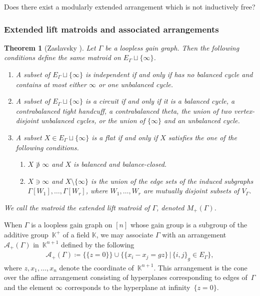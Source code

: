 \documentclass[pdftex]{sigma}
\numberwithin{equation}{section}
\newtheorem{Theorem}{Theorem}[section]
\begin{document}
\begin{Question}Does there exist a modularly extended arrangement which is not inductively free?
\end{Question}


\subsubsection{Extended lift matroids and associated arrangements}
\begin{Theorem}[{Zaslavsky \cite[Theorem~3.1]{zaslavsky1991biased-joctsb}}]\label{Zaslavsky extended lift matroid}
Let $ \Gamma $ be a loopless gain graph.
Then the following conditions define the same matroid on $ E_{\Gamma} \sqcup \{\infty\} $.
\begin{enumerate}[$(a)$]\itemsep=0pt
\item\label{Zaslavsky extended lift matroid a} A subset of $ E_{\Gamma} \sqcup \{\infty\} $ is independent if and only if has no balanced cycle and contains at most either $ \infty $ or one unbalanced cycle.
\item\label{Zaslavsky extended lift matroid b} A subset of $ E_{\Gamma} \sqcup \{\infty\} $ is a circuit if and only if it is a balanced cycle, a contrabalanced tight handcuff, a contrabalanced theta, the union of two vertex-disjoint unbalanced cycles, or the union of $ \{\infty\} $ and an unbalanced cycle.
\item\label{Zaslavsky extended lift matroid c} A subset $ X \in E_{\Gamma} \sqcup \{\infty\} $ is a flat if and only if $ X $ satisfies the one of the following conditions.
\begin{enumerate}[$(i)$]\itemsep=0pt
\item$ X \not\ni \infty $ and $ X $ is balanced and balance-closed.
\item $ X \ni \infty $ and $ X\setminus\{\infty\} $ is the union of the edge sets of the induced subgraphs $ \Gamma[W_{1}], \dots,\allowbreak \Gamma[W_{r}] $, where $ W_{1}, \dots, W_{r} $ are mutually disjoint subsets of $ V_{\Gamma} $.
\end{enumerate}
\end{enumerate}
We call the matroid the \textit{extended lift matroid} of $ \Gamma $, denoted $ M_{+}(\Gamma) $.
\end{Theorem}

When $ \Gamma $ is a loopless gain graph on $ [n] $ whose gain group is a subgroup of the additive group~$ \mathbb{K}^{+} $ of a field $ \mathbb{K} $, we may associate $ \Gamma $ with an arrangement~$ \mathcal{A}_{+}(\Gamma) $ in~$ \mathbb{K}^{n+1} $ defined by the following
\begin{gather*}
\mathcal{A}_{+}(\Gamma) \coloneqq \{\{z=0\}\} \cup \{\{x_{i}-x_{j}=gz\} \,|\, \{i,j\}_{g} \in E_{\Gamma}\},
\end{gather*}
where $ z, x_{1}, \dots, x_{n} $ denote the coordinate of~$ \mathbb{K}^{n+1} $.
This arrangement is the cone over the affine arrangement consisting of hyperplanes corresponding to edges of~$ \Gamma $ and the element $ \infty $ corresponds to the hyperplane at infinity~$ \{z=0\} $.
\end{document}
